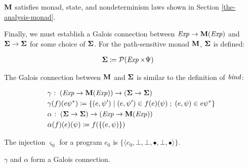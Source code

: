 \begin{proposition} $ \mathtt{\mathbf{M}} $ satisfies monad, state, and
nondeterminism laws shown in Section \ref{the-analysis-monad}.
\end{proposition}

\par

Finally, we must establish a Galois connection between
$ \operatorname{\mathit{Exp}}   \rightarrow   \mathtt{\mathbf{M}}(  \operatorname{\mathit{Exp}}) $ and
$ \mathtt{\mathbf{\Sigma}}   \rightarrow   \mathtt{\mathbf{\Sigma}} $ for some choice
of $ \mathtt{\mathbf{\Sigma}} $. For the path-sensitive monad
$ \mathtt{\mathbf{M}} $, $ \mathtt{\mathbf{\Sigma}} $ is defined:

\small\begin{align*}
&\hspace{0em}  \mathtt{\mathbf{\Sigma}}   \coloneqq   \mathcal{P}  (\operatorname{\mathit{Exp}}   \times   \Psi )
\end{align*}\normalsize

The Galois connection between $ \mathtt{\mathbf{M}} $ and
$ \mathtt{\mathbf{\Sigma}} $ is similar to the definition of $ \operatorname{\mathit{bind}} $:

\small\begin{align*}
&\hspace{0em}  \gamma   \mathbin{\colon}   (\operatorname{\mathit{Exp}}   \rightarrow   \mathtt{\mathbf{M}}(  \operatorname{\mathit{Exp}}) )  \rightarrow  ( \mathtt{\mathbf{\Sigma}}   \rightarrow   \mathtt{\mathbf{\Sigma}} ) \\
&\hspace{0em}  \gamma (f)(e \psi  ^{ * } )  \coloneqq   \{ (e, \psi ')  \;|\;  (e, \psi ')  \in  f(e)( \psi )  \;;\;  (e, \psi )  \in  e \psi  ^{ * }  \}  \\
&\hspace{0em}  \alpha   \mathbin{\colon}  ( \mathtt{\mathbf{\Sigma}}   \rightarrow   \mathtt{\mathbf{\Sigma}} )  \rightarrow   (\operatorname{\mathit{Exp}}   \rightarrow   \mathtt{\mathbf{M}}(  \operatorname{\mathit{Exp}}) ) \\
&\hspace{0em}  \alpha (f)(e)( \psi )  \coloneqq  f( \{ (e, \psi ) \} )
\end{align*}\normalsize

The injection $ \varsigma  _0 $ for a program $e _0 $ is
$ \{  \langle e _0 , \bot , \bot , \bullet , \bot , \bullet  \rangle  \} $.
\begin{proposition} $ \gamma $ and $ \alpha $ form a Galois connection.
\end{proposition}

\par

